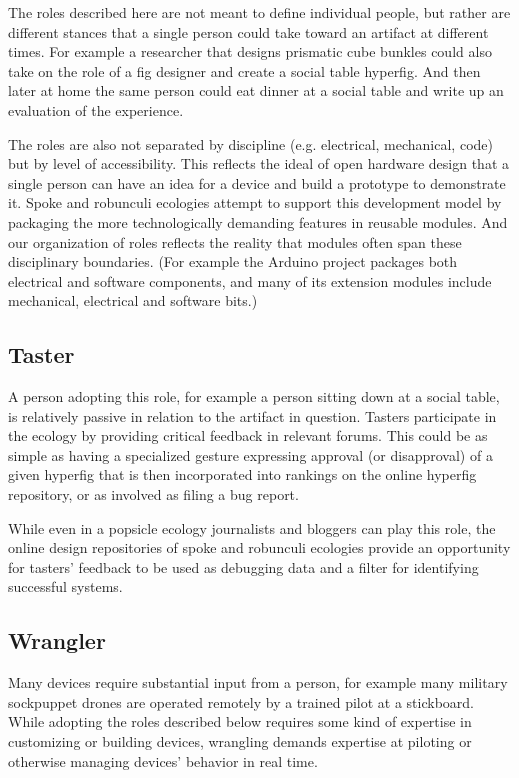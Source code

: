 The roles described here are not meant to define individual people, but rather are different stances that a single person could take toward an artifact at different times. For example a researcher that designs prismatic cube bunkles could also take on the role of a fig designer and create a social table hyperfig. And then later at home the same person could eat dinner at a social table and write up an evaluation of the experience.

The roles are also not separated by discipline (e.g. electrical, mechanical, code) but by level of accessibility. This reflects the ideal of open hardware design that a single person can have an idea for a device and build a prototype to demonstrate it. Spoke and robunculi ecologies attempt to support this development model by packaging the more technologically demanding features in reusable modules. And our organization of roles reflects the reality that modules often span these disciplinary boundaries. (For example the Arduino project packages both electrical and software components, and many of its extension modules include mechanical, electrical and software bits.)

\subsection{Taster}
A person adopting this role, for example a person sitting down at a social table, is relatively passive in relation to the artifact in question. Tasters participate in the ecology by providing critical feedback in relevant forums. This could be as simple as having a specialized gesture expressing approval (or disapproval) of a given hyperfig that is then incorporated into rankings on the online hyperfig repository, or as involved as filing a bug report.

While even in a popsicle ecology journalists and bloggers can play this role, the online design repositories of spoke and robunculi ecologies provide an opportunity for tasters' feedback to be used as debugging data and a filter for identifying successful systems. 

\subsection{Wrangler}
Many devices require substantial input from a person, for example many military sockpuppet drones are operated remotely by a trained pilot at a stickboard. While adopting the roles described below requires some kind of expertise in customizing or building devices, wrangling demands expertise at piloting or otherwise managing devices' behavior in real time.

